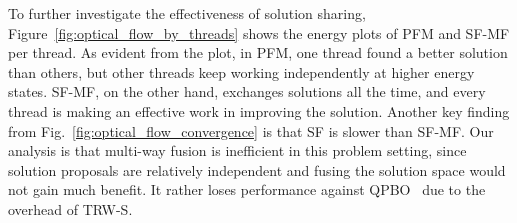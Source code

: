 % 
%
To further investigate the effectiveness of solution sharing,
Figure~\ref{fig:optical_flow_by_threads} shows the energy plots of PFM
and SF-MF per thread. As evident from the plot, in PFM, one thread found
a better solution than others, but other threads keep working
independently at higher energy states. SF-MF, on the other hand,
exchanges solutions all the time, and every thread is making an effective
work in improving the solution.
Another key finding from Fig.~\ref{fig:optical_flow_convergence} is that
SF is slower than SF-MF. Our analysis is that multi-way fusion is
inefficient in this problem setting, since solution proposals are
relatively independent and fusing the solution space would not gain much
benefit. It rather loses performance against QPBO~\cite{QPBO} due to the
overhead of TRW-S.

